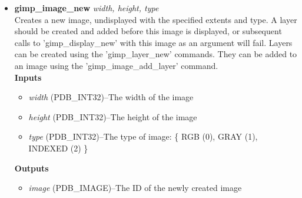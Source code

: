 \documentclass{article}
\begin{document}
\begin{itemize}
\item {\scriptsize{\bf gimp\_image\_new} {\it width, height, type}\\
Creates a new image, undisplayed with the specified extents and type.
A layer should be created and added before this image is displayed, or
subsequent calls to 'gimp\_display\_new' with this image as an argument
will fail.  Layers can be created using the 'gimp\_layer\_new' commands.
They can be added to an image using the 'gimp\_image\_add\_layer'
command.\\
\bf Inputs \rm
\begin{itemize}
\item {\it width} (PDB\_INT32)--The width of the image
\item {\it height} (PDB\_INT32)--The height of the image
\item {\it type} (PDB\_INT32)--The type of image: \{ RGB (0), GRAY (1), INDEXED (2) \}
\end{itemize}
\bf Outputs \rm
\begin{itemize}
\item {\it image} (PDB\_IMAGE)--The ID of the newly created image
\end{itemize}}


\end{itemize}
\end{document}
